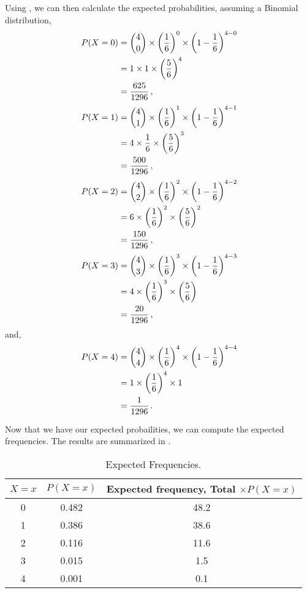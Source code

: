 \begin{subquestions}
Using , we can then calculate the expected probabilities, assuming a Binomial distribution,
\begin{align}
	P(X=0) & = { 4 \choose 0} \times \left(\frac{1}{6} \right)^0 \times \left(1-\frac{1}{6} \right)^{4-0} \nonumber \\
	       & = 1 \times 1 \times \left(\frac{5}{6} \right)^{4} \nonumber \\
	       & = \frac{625}{1296} \,,
\end{align}
\begin{align}
	P(X=1) & = { 4 \choose 1} \times \left(\frac{1}{6} \right)^1 \times \left(1-\frac{1}{6} \right)^{4-1} \nonumber \\
		   & = 4 \times \frac{1}{6} \times \left(\frac{5}{6} \right)^{3} \nonumber \\
		   & = \frac{500}{1296} \,,
\end{align}
\begin{align}
	P(X=2) & = { 4 \choose 2} \times \left(\frac{1}{6} \right)^2 \times \left(1-\frac{1}{6} \right)^{4-2} \nonumber \\
		   & = 6 \times \left(\frac{1}{6}\right)^2 \times \left(\frac{5}{6} \right)^{2} \nonumber \\
		   & = \frac{150}{1296} \,,
\end{align}
\begin{align}
	P(X=3) & = { 4 \choose 3} \times \left(\frac{1}{6} \right)^3 \times \left(1-\frac{1}{6} \right)^{4-3} \nonumber \\
		   & = 4 \times \left(\frac{1}{6}\right)^3 \times \left(\frac{5}{6} \right) \nonumber \\
      	   & = \frac{20}{1296} \,,
\end{align}
and,
\begin{align}
    P(X=4) & = { 4 \choose 4} \times \left(\frac{1}{6} \right)^4 \times \left(1-\frac{1}{6} \right)^{4-4} \nonumber \\
    	   & = 1 \times \left(\frac{1}{6}\right)^4 \times 1 \nonumber \\
    	   & = \frac{1}{1296} \,.
\end{align}

Now that we have our expected probailities, we can compute the expected frequencies. The results are summarized in .
	
\begin{table}[H]
	\centering
	\begin{tabular}{|c|c|c|}
		\hline
		$X=x$ & $P(X=x)$ & Expected frequency, Total $\times P(X=x)$ \\
		\hline
		0 & 0.482 & 48.2 \\
		1 & 0.386 & 38.6 \\
		2 & 0.116 & 11.6 \\
		3 & 0.015 & 1.5 \\
		4 & 0.001 & 0.1 \\
		\hline
	\end{tabular}
	\caption{\label{2008M:q3:Bin1} Expected Frequencies.}
\end{table}


\end{subquestions}
